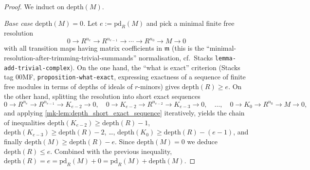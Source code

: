 \begin{proof}
  \leanok


  We induct on \(\text{depth}(M)\).

  \emph{Base case \(\text{depth}(M) = 0\).} Let \(e := \text{pd}_R(M)\) and pick a minimal
  finite free resolution
  \[
    0 \longrightarrow R^{n_e} \longrightarrow R^{n_{e-1}} \longrightarrow
    \cdots \longrightarrow R^{n_0} \longrightarrow M \longrightarrow 0
  \]
  with all transition maps having matrix coefficients in \(\mathfrak{m}\) (this is the
  ``minimal-resolution-after-trimming-trivial-summands'' normalisation, cf.\ Stacks
  \texttt{lemma-add-trivial-complex}). On the one hand, the ``what is exact'' criterion
  (Stacks tag 00MF, \texttt{proposition-what-exact}, expressing exactness of a sequence of
  finite free modules in terms of depths of ideals of \(r\)-minors) gives
  \(\text{depth}(R) \geq e\). On the other hand, splitting the resolution into short exact
  sequences
  \[
    0 \to R^{n_e} \to R^{n_{e-1}} \to K_{e-2} \to 0, \quad
    0 \to K_{e-2} \to R^{n_{e-2}} \to K_{e-3} \to 0, \quad \dots, \quad
    0 \to K_0 \to R^{n_0} \to M \to 0,
  \]
  and applying \ref{mk-lem:depth_short_exact_sequence} iteratively,
  yields the chain of inequalities
  \(\text{depth}(K_{e-2}) \geq \text{depth}(R) - 1\),
  \(\text{depth}(K_{e-3}) \geq \text{depth}(R) - 2\), \dots,
  \(\text{depth}(K_0) \geq \text{depth}(R) - (e-1)\), and finally
  \(\text{depth}(M) \geq \text{depth}(R) - e\). Since \(\text{depth}(M) = 0\) we deduce
  \(\text{depth}(R) \leq e\). Combined with the previous inequality, $\text{depth}(R) = e =
  \text{pd}_R(M) + 0 = \text{pd}_R(M) + \text{depth}(M)$.


\end{proof}
